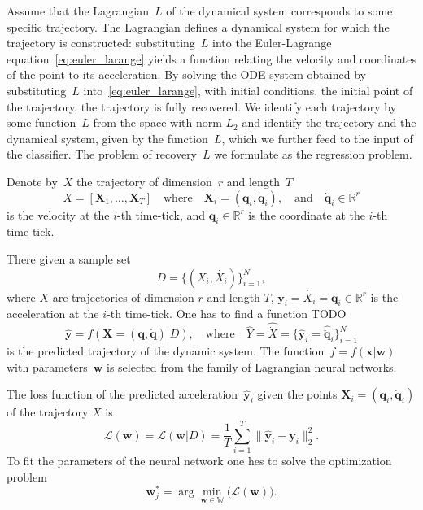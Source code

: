\documentclass[12pt]{paper}
\begin{document}
Assume that the Lagrangian~$L$  of the dynamical system corresponds to some specific trajectory. The Lagrangian defines a dynamical system for which the trajectory is constructed: substituting~$L$ into the
Euler-Lagrange equation~\eqref{eq:euler_larange} yields a function relating the velocity and coordinates of the point to its acceleration. By solving the ODE system obtained by substituting~$L$ into~\eqref{eq:euler_larange}, with initial conditions, the initial point of the trajectory, the trajectory is fully recovered.  We identify each trajectory by some function~$L$ from the space with norm $L_2$ and identify the trajectory and the dynamical system, given by the function~$L$, which we further feed to the input of the classifier. The problem of recovery~$L$ we formulate as the regression problem.

Denote by~$X$ the trajectory of dimension~$r$ and length~$T$ 
\begin{equation}
X = [\mathbf{X}_1,\dots, \mathbf{X}_T] \quad \text{where} \quad \mathbf{X}_i = (\mathbf{q}_i, \dot{\mathbf{q}}_i), \quad  \text{and}\quad \dot{\mathbf{q}}_i \in \mathbb{R}^r
\label{definition:trajectory}
\end{equation}
is the velocity at the $i$-th time-tick, and $\mathbf{q}_i \in \mathbb{R}^r$  is the coordinate at the $i$-th time-tick.

There given a sample set 
\begin{equation}
D = \{(X_i, \dot{X_i})\}_{i=1}^N,
\label{eq:dataset}
\end{equation}
where $X$ are trajectories of dimension $r$ and length $T$, $\mathbf{y}_i = \dot{X_i} = \ddot{\mathbf{q}}_i \in \mathbb{R}^r$ is the acceleration at the $i$-th time-tick. One has to find a function TODO
\begin{equation}
\hat{\mathbf{y}}  = f(\mathbf{X} = (\mathbf{q}, \dot{\mathbf{q}}) | D),
\quad
\text{where}
\quad
\hat{Y} =\hat{\dot{X}} = \{\hat{\mathbf{y}}_i = \hat{\ddot{\mathbf{q}}}_i\}_{i=1}^N
\label{eq:model}
\end{equation}
is the predicted trajectory of the dynamic system. The function~$f=f(\mathbf{x} | \mathbf{w})$ with parameters~$\mathbf{w}$ is selected from the family  of Lagrangian neural networks.

The loss function of the predicted acceleration~$\hat{\mathbf{y}}_i$ given the points $\mathbf{X}_i = (\mathbf{q}_i, \dot{\mathbf{q}}_i)$ of the trajectory $X$ is 
\begin{equation}
 \mathcal{L}(\textbf{w}) = \mathcal{L}(\mathbf{w} | D) = \frac{1}{T}\sum_{i=1}^{T} \| \hat{\mathbf{y}}_i - \mathbf{y}_i \|_2^2.
\end{equation}
To fit the parameters of the neural network one hes to solve the optimization problem
\begin{equation} 
\label{eq:opt_task}
\textbf{w}_j^* = \arg\min_{\mathbf{w} \in \mathbb{W}} \bigl( \mathcal{L}(\textbf{w}) \bigr). 
\end{equation}
\end{document}
